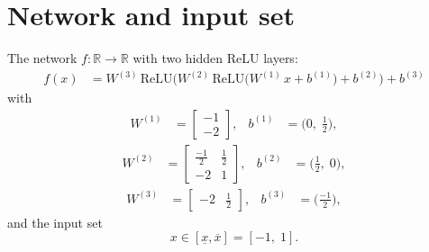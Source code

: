 \documentclass[11pt]{article}
\begin{document}
\section{Network and input set}
The network $f:\mathbb{R} \to \mathbb{R}$ with two hidden ReLU layers:
\begin{align*}
f(x) &= W^{(3)}\,\mathrm{ReLU}\bigl(W^{(2)}\,\mathrm{ReLU}\bigl(W^{(1)}\,x + b^{(1)}\bigr) + b^{(2)}\bigr) + b^{(3)}
\end{align*}
with
\begin{align*}
W^{(1)} &= \begin{bmatrix}
-1 \\
-2
\end{bmatrix}, & b^{(1)} &= \bigl(0,\; \frac{1}{2}\bigr),
\end{align*}
\begin{align*}
W^{(2)} &= \begin{bmatrix}
\frac{-1}{2} & \frac{1}{2} \\
-2 & 1
\end{bmatrix}, & b^{(2)} &= \bigl(\frac{1}{2},\; 0\bigr),
\end{align*}
\begin{align*}
W^{(3)} &= \begin{bmatrix}
-2 & \frac{1}{2}
\end{bmatrix}, & b^{(3)} &= \bigl(\frac{-1}{2}\bigr),
\end{align*}
and the input set
\begin{equation*}
 x \in [\underline{x}, \overline{x}] = [-1,\; 1].
\end{equation*}
\end{document}
